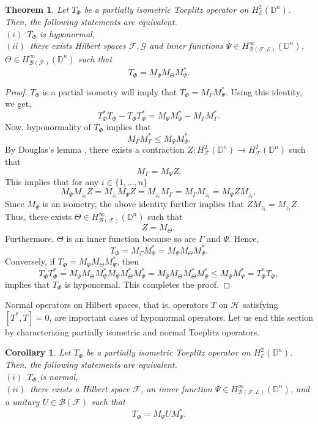 \documentclass[12pt]{amsart}
\newtheorem{thm}[propn]{Theorem}
\newtheorem{cor}[propn]{Corollary}
\theoremstyle{definition}
\newcommand{\D}{\mathbb{D}}
\newcommand{\1}{{\mbox{\bf 1}}}
\newcommand{\clb}{\mathcal{B}}
\newcommand{\cle}{\mathcal{E}}
\newcommand{\clf}{\mathcal{F}}
\newcommand{\clg}{\mathcal{G}}
\newcommand{\clh}{\mathcal{H}}
\newcommand{\raro}{\rightarrow}
\begin{document}
\begin{thm}\label{hyponormal}
Let $T_{\Phi}$ be a partially isometric Toeplitz operator on $H_{\cle}^2(\D^n)$. Then, the following statements are equivalent.\\
$(i)$~$T_{\Phi}$ is hyponormal,\\
$(ii)$~there exists Hilbert spaces $\clf, \clg$ and inner functions $\Psi \in H_{\clb(\clf,\cle)}^{\infty}(\D^n)$, $ \Theta \in H_{\clb(\clf)}^{\infty}(\D^n)$ such that
\[
T_{\Phi} = M_{\Psi} M_{\Theta} M_{\Psi}^*.
\]
\end{thm}
\begin{proof}
$T_{\Phi}$ is a partial isometry will imply that $T_{\Phi} = M_{\Gamma} M_{\Psi}^*$. Using this identity, we get,
\[
T_{\Phi}^* T_{\Phi} - T_{\Phi} T_{\Phi}^* = M_{\Psi} M_{\Psi}^* - M_{\Gamma}M_{\Gamma}^*.
\]
Now, hyponormality of $T_{\Phi}$ implies that 
\[
 M_{\Gamma}M_{\Gamma}^* \leq M_{\Psi} M_{\Psi}^*.
\]
By Douglas's lemma \cite{Douglas2}, there exists a contraction $Z: H_{\clf}^2(\D^n) \raro H_{\clf}^2(\D^n)$ such that
\[
 M_{\Gamma} = M_{\Psi} Z.
\]
This implies that for any $i \in \{1,\ldots,n\}$
\[
M_{\Psi} M_{z_i} Z =  M_{z_i}  M_{\Psi} Z = M_{z_i} M_{\Gamma} = M_{\Gamma} M_{z_i} = M_{\Psi} Z M_{z_i},
\]
Since $M_{\Psi}$ is an isometry, the above identity further implies that $Z M_{z_i} = M_{z_i} Z$. Thus, there exists $\Theta \in H_{\clb(\clf)}^{\infty}(\D^n)$ such that
\[
Z = M_{\Theta},
\]
Furthermore, $\Theta$ is an inner function because so are $\Gamma$ and $\Psi$. Hence,
\[
T_{\Phi} = M_{\Gamma} M_{\Psi}^* = M_{\Psi} M_{\Theta} M_{\Psi}^*.
\]
Conversely, if $T_{\Phi} = M_{\Psi} M_{\Theta} M_{\Psi}^*$, then 
\[
T_{\Phi}T_{\Phi}^* = M_{\Psi} M_{\Theta} M_{\Psi}^*M_{\Psi} M_{\Theta}^* M_{\Psi}^* = M_{\Psi} M_{\Theta} M_{\Theta}^* M_{\Psi}^* \leq M_{\Psi}M_{\Psi}^* = T_{\Phi}^* T_{\Phi},
\]
implies that $T_{\Phi}$ is hyponormal. This completes the proof.
\end{proof}
Normal operators on Hilbert spaces, that is, operators $T$ on $\clh$ satisfying $[T^*, T]=0$, are important cases of hyponormal operators. Let us end this section by characterizing partially isometric and normal Toeplitz operators.
\begin{cor}\label{normal}
Let $T_{\Phi}$ be a partially isometric Toeplitz operator on $H_{\cle}^2(\D^n)$. Then, the following statements are equivalent.\\
$(i)$~$T_{\Phi}$ is normal,\\
$(ii)$~there exists a Hilbert space $\clf$, an inner function $\Psi \in H_{\clb(\clf,\cle)}^{\infty}(\D^n)$, and a unitary $U \in \clb(\clf)$ such that
\[
T_{\Phi} = M_{\Psi} U M_{\Psi}^*.
\]
\end{cor}
\end{document}
